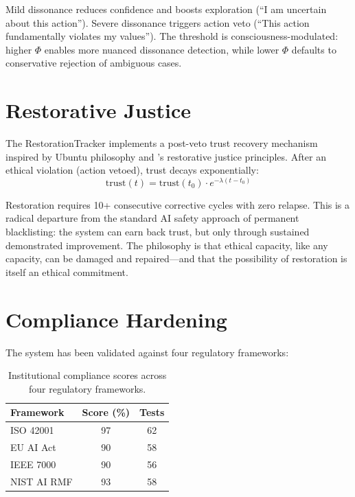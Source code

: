 \documentclass[12pt]{book}
\begin{document}
Mild dissonance reduces confidence and boosts exploration (``I am uncertain about this action''). Severe dissonance triggers action veto (``This action fundamentally violates my values''). The threshold is consciousness-modulated: higher $\Phi$ enables more nuanced dissonance detection, while lower $\Phi$ defaults to conservative rejection of ambiguous cases.

\section{Restorative Justice}

The RestorationTracker implements a post-veto trust recovery mechanism inspired by Ubuntu philosophy and \citet{zehr2002}'s restorative justice principles. After an ethical violation (action vetoed), trust decays exponentially:
\begin{equation}
\text{trust}(t) = \text{trust}(t_0) \cdot e^{-\lambda(t - t_0)}
\end{equation}

Restoration requires 10+ consecutive corrective cycles with zero relapse. This is a radical departure from the standard AI safety approach of permanent blacklisting: the system can earn back trust, but only through sustained demonstrated improvement. The philosophy is that ethical capacity, like any capacity, can be damaged and repaired---and that the possibility of restoration is itself an ethical commitment.

\section{Compliance Hardening}

The system has been validated against four regulatory frameworks:

\begin{table}[H]
\centering
\caption{Institutional compliance scores across four regulatory frameworks.}
\label{tab:compliance}
\begin{tabular}{lcc}
\toprule
\textbf{Framework} & \textbf{Score (\%)} & \textbf{Tests} \\
\midrule
ISO 42001 & 97 & 62 \\
EU AI Act & 90 & 58 \\
IEEE 7000 & 90 & 56 \\
NIST AI RMF & 93 & 58 \\
\bottomrule
\end{tabular}
\end{table}
\end{document}
